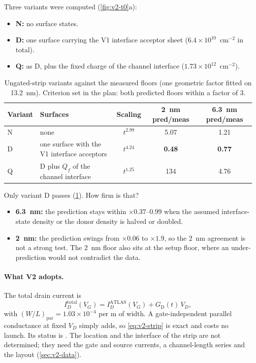 Three variants were computed (\cref{fig:v2-t0}a):
\begin{itemize}
\item \textbf{N:} no surface states.
\item \textbf{D:} one surface carrying the V1 interface acceptor sheet ($6.4\times10^{10}$~cm$^{-2}$ in total).
\item \textbf{Q:} as D, plus the fixed charge of the channel interface ($1.73\times10^{12}$~cm$^{-2}$).
\end{itemize}

\begin{table}[htbp]\centering\small
\caption{Ungated-strip variants against the measured floors (one geometric factor fitted on 13.2~nm). Criterion set in
the plan: both predicted floors within a factor of 3.}\label{tab:v2-strip}
\begin{tabular}{llccc}\toprule
Variant & Surfaces & Scaling & 2~nm pred/meas & 6.3~nm pred/meas\\\midrule
N & none & $t^{2.99}$ & 5.07 & 1.21\\
D & one surface with the V1 interface acceptors & $t^{4.24}$ & \textbf{0.48} & \textbf{0.77}\\
Q & D plus $Q_f$ of the channel interface & $t^{1.25}$ & 134 & 4.76\\\bottomrule
\end{tabular}
\end{table}

Only variant D passes (\cref{tab:v2-strip}). How firm is that?
\begin{itemize}
\item \textbf{6.3~nm:} the prediction stays within $\times0.37$--$0.99$ when the assumed interface-state density or the
donor density is halved or doubled.
\item \textbf{2~nm:} the prediction swings from $\times0.06$ to $\times1.9$, so the 2~nm agreement is not a strong
test. The 2~nm floor also sits at the setup floor, where an under-prediction would not contradict the data.
\end{itemize}

\paragraph{What V2 adopts.} The total drain current is
\begin{equation}
I_D^{\mathrm{total}}(V_G) = I_D^{\mathrm{ATLAS}}(V_G) + G_{\mathrm{D}}(t)\,V_D ,
\label{eq:v2-strip}
\end{equation}
with $(W/L)_{\mathrm{par}} = 1.03\times10^{-4}$ per \textmu m of width. A gate-independent parallel conductance at
fixed $V_D$ simply adds, so \cref{eq:v2-strip} is exact and costs no launch. Its status is . The
location and the interface of the strip are not determined; they need the gate and source currents, a channel-length
series and the layout (\cref{sec:v2-data}).

